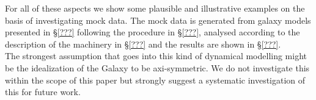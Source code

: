 For all of these aspects we show some plausible and illustrative examples on the basis of investigating mock data. The mock data is generated from galaxy models presented in \S\ref{???} following the procedure in \S\ref{???}, analysed according to the description of the machinery in \S\ref{???} and the results are shown in \S\ref{???}.\\

The strongest assumption that goes into this kind of dynamical modelling might be the idealization of the Galaxy to be axi-symmetric. We do not investigate this within the scope of this paper but strongly suggest a systematic investigation of this for future work.

